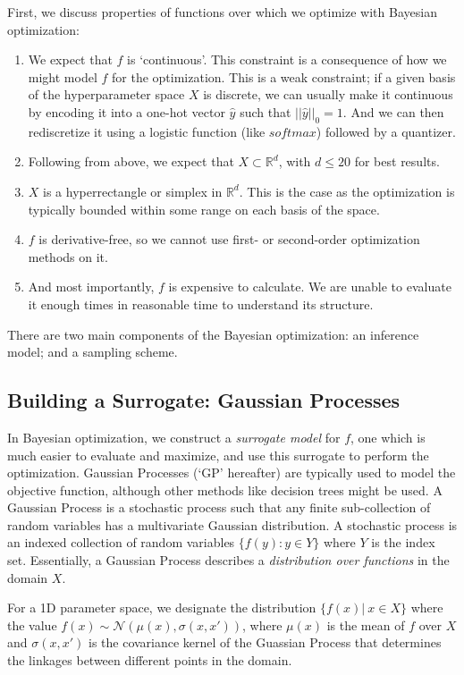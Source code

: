 \documentclass[paper=a4, fontsize=12pt]{scrartcl} %
\numberwithin{equation}{section} %
\numberwithin{figure}{section} %
\numberwithin{table}{section} %
\begin{document}
First, we discuss properties of functions over which we optimize with Bayesian optimization:
\begin{enumerate}
    \item We expect that $f$ is `continuous'. This constraint is a consequence of how we might model $f$ for the optimization. This is a weak constraint;
    if a given basis of the hyperparameter space $X$ is discrete, we can usually make it continuous by encoding it into a one-hot vector $\hat{y}$ such that $||\hat{y}||_0 = 1$. And we can then rediscretize it 
    using a logistic function (like $softmax$) followed by a quantizer.
    \item Following from above, we expect that $X \subset \mathbb{R}^d$, with $d \leq 20$ for best results.
    \item $X$ is a hyperrectangle or simplex in $\mathbb{R}^d$. This is the case as the optimization is typically bounded within some range on each basis of the space.
    \item $f$ is derivative-free, so we cannot use first- or second-order optimization methods on it.
    \item And most importantly, $f$ is expensive to calculate. We are unable to evaluate it enough times in reasonable time to understand its structure.
\end{enumerate}

There are two main components of the Bayesian optimization: an inference model; and a sampling scheme.

\subsection{Building a Surrogate: Gaussian Processes}
In Bayesian optimization, we construct a \textit{surrogate model} for $f$, one which is much easier to evaluate and maximize, and use this surrogate to perform the optimization.
Gaussian Processes (`GP' hereafter) are typically used to model the objective function, although other methods like decision trees might be used. A Gaussian Process is a stochastic 
process such that any finite sub-collection of random variables has a multivariate Gaussian distribution. A stochastic process is an indexed collection of random variables $\{ f(y): y \in Y \}$ where 
$Y$ is the index set. Essentially, a Gaussian Process describes a \textit{distribution over functions} in the domain $X$.

For a 1D parameter space, we designate the distribution $\{ f(x) |\ x \in X \}$ where the value $f(x) \sim \mathcal{N}(\mu(x), \sigma(x, x'))$, where $\mu(x)$ is the mean of $f$ over $X$ and $\sigma(x, x')$ is the covariance kernel
of the Guassian Process that determines the linkages between different points in the domain.
\end{document}

